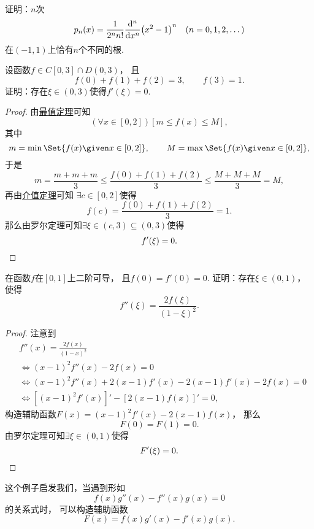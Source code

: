 \begin{example}
证明：\(n\)次\[
	p_n(x) = \frac1{2^n n!} \dv[n]{x} (x^2-1)^n
	\quad(n=0,1,2,\dotsc)
\]在\((-1,1)\)上恰有\(n\)个不同的根.
\end{example}

\begin{example}
设函数\(f \in C[0,3] \cap D(0,3)\)，
且\[
	f(0) + f(1) + f(2) = 3,
	\qquad
	f(3) = 1.
\]
证明：存在\(\xi\in(0,3)\)使得\(f'(\xi) = 0\).
\begin{proof}
由\hyperref[theorem:极限.最值定理]{最值定理}可知\[
	(\forall x\in[0,2])
	[m \leq f(x) \leq M],
\]
其中\[
	m = \min\Set{ f(x) \given x\in[0,2] },
	\qquad
	M = \max\Set{ f(x) \given x\in[0,2] },
\]
于是\[
	m = \frac{m+m+m}3 \leq \frac{f(0) + f(1) + f(2)}3 \leq \frac{M+M+M}3 = M,
\]
再由\hyperref[theorem:极限.闭区间上连续函数的性质.介值定理2]{介值定理}可知
\(\exists c\in[0,2]\)使得\[
	f(c) = \frac{f(0) + f(1) + f(2)}3 = 1.
\]
那么由罗尔定理可知\(\exists\xi\in(c,3)\subseteq(0,3)\)使得\[
	f'(\xi) = 0.
	\qedhere
\]
\end{proof}
\end{example}

\begin{example}
在函数\(f\)在\([0,1]\)上二阶可导，
且\(f(0) = f'(0) = 0\).
证明：存在\(\xi\in(0,1)\)，
使得\[
	f''(\xi) = \frac{2 f(\xi)}{(1-\xi)^2}.
\]
\begin{proof}
注意到\begin{align*}
	&f''(x) = \frac{2 f(x)}{(1-x)^2} \\
	&\iff
	(x-1)^2 f''(x) - 2 f(x) = 0 \\
	&\iff
	(x-1)^2 f''(x) + 2 (x-1) f'(x) - 2 (x-1) f'(x) - 2 f(x) = 0 \\
	&\iff
	[(x-1)^2 f'(x)]' - [2 (x-1) f(x)]' = 0,
\end{align*}
构造辅助函数\(F(x) = (x-1)^2 f'(x) - 2 (x-1) f(x)\)，
那么\[
	F(0) = F(1) = 0.
\]
由罗尔定理可知\(\exists\xi\in(0,1)\)使得\[
	F'(\xi) = 0.
	\qedhere
\]
\end{proof}
\end{example}
\begin{remark}
这个例子启发我们，当遇到形如\[
	f(x) g''(x) - f''(x) g(x) = 0
\]的关系式时，
可以构造辅助函数\[
	F(x) = f(x) g'(x) - f'(x) g(x).
\]
\end{remark}


